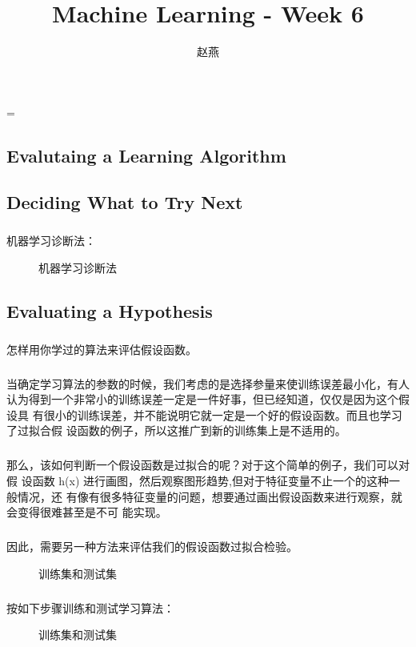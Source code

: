 \documentclass{article}
\title{Machine Learning - Week 6}
\author{赵燕}
\date{}
\begin{document}
 
\hfuzz=\maxdimen
{}
\begin{CJK}{UTF8}{gbsn} 
\maketitle
\renewcommand\contentsname{目录}
\renewcommand\figurename{图}
\tableofcontents
\newpage

\section{Evalutaing a Learning Algorithm}
\subsection{Deciding What to Try Next}
\begin{figure}[H]
\label{fig:601}
\end{figure}
\subparagraph{}
机器学习诊断法：
\begin{figure}[H]
\caption{机器学习诊断法}
\label{fig:602}
\end{figure}
\begin{figure}[H]
\label{fig:603}
\end{figure}
\subsection{Evaluating a Hypothesis}
\subparagraph{}
怎样用你学过的算法来评估假设函数。
\begin{figure}[H]
\label{fig:604}
\end{figure}
\subparagraph{}
当确定学习算法的参数的时候，我们考虑的是选择参量来使训练误差最小化，有人
认为得到一个非常小的训练误差一定是一件好事，但已经知道，仅仅是因为这个假设具
有很小的训练误差，并不能说明它就一定是一个好的假设函数。而且也学习了过拟合假
设函数的例子，所以这推广到新的训练集上是不适用的。
\subparagraph{}
那么，该如何判断一个假设函数是过拟合的呢？对于这个简单的例子，我们可以对假
设函数 h(x) 进行画图，然后观察图形趋势,但对于特征变量不止一个的这种一般情况，还
有像有很多特征变量的问题，想要通过画出假设函数来进行观察，就会变得很难甚至是不可
能实现。
\subparagraph{}
因此，需要另一种方法来评估我们的假设函数过拟合检验。
\begin{figure}[H]
\caption{训练集和测试集}
\label{fig:604}
\end{figure}
\subparagraph{}
\begin{figure}[H]
\label{fig:606}
\end{figure}
\subparagraph{}
按如下步骤训练和测试学习算法：
\begin{figure}[H]
\caption{训练集和测试集}
\label{fig:608}
\end{figure}

\end{CJK}
\end{document}
